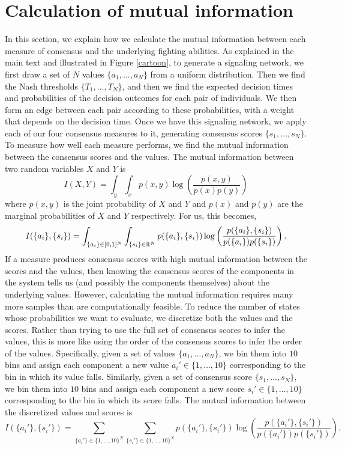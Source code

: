 \documentclass{article}
\begin{document}
\section{Calculation of mutual information \label{mut_info_calc} }
In this section, we explain how we calculate the mutual information between each measure of consensus and the underlying fighting abilities. 
As explained in the main text and illustrated in Figure \ref{cartoon}, to generate a signaling network, we first draw a set of $N$ values $\{a_1,\dots,a_N\}$ from a uniform distribution. Then we find the Nash thresholds $\{T_1,\dots,T_N\}$, and then we find the expected decision times and probabilities of the decision outcomes for each pair of individuals. We then form an edge between each pair according to these probabilities, with a weight that depends on the decision time.  Once we have this signaling network, we apply each of our four consensus measures to it, generating consensus scores $\{s_1,\dots,s_N\}$.  To measure how well each measure performs, we find the mutual information between the consensus scores and the values. The mutual information between two random variables $X$ and $Y$ is 
\begin{equation}
I(X,Y)=\int_{y}\int_{x}p(x,y)\log\left(\frac{p(x,y)}{p(x)p(y)}\right)
\end{equation}
where $p(x,y)$ is the joint probability of $X$ and $Y$ and $p(x)$ and $p(y)$ are the marginal probabilities of $X$ and $Y$ respectively. For us, this becomes,
\begin{equation}
I(\{a_i\},\{s_i\})=\int_{\{a_i\}\in[0,1]^N}\int_{\{s_i\}\in{\mathbb{R}}^N}p(\{a_i\},\{s_i\})\log\left(\frac{p(\{a_i\},\{s_i\})}{p(\{a_i\})p(\{s_i\})}\right).
\end{equation}
If a measure produces consensus scores with high mutual information between the scores and the values, then knowing the consensus scores of the components in the system tells us (and possibly the components themselves) about the underlying values.  However, calculating the mutual information requires many more samples than are computationally feasible.  To reduce the number of states whose probabilities we want to evaluate, we discretize both the values and the scores.  Rather than trying to use the full set of consensus scores to infer the values, this is more like using the order of the consensus scores to infer the order of the values. Specifically, given a set of values $\{a_1,\dots,a_N\}$, we bin them into $10$ bins and assign each component a new value $a_i'\in\{1,\dots,10\}$ corresponding to the bin in which its value falls.  Similarly, given a set of consensus score $\{s_1,\dots,s_N\}$, we bin them into $10$ bins and assign each component a new score $s_i'\in\{1,\dots,10\}$ corresponding to the bin in which its score falls.  The mutual information between the discretized values and scores is
\begin{equation}
I(\{a_i'\},\{s_i'\})=\sum_{\{a_i'\}\in\{1,\dots,10\}^N}\sum_{\{s_i'\}\in\{1,\dots,10\}^N}p(\{a_i'\},\{s_i'\})\log\left(\frac{p(\{a_i'\},\{s_i'\})}{p(\{a_i'\})p(\{s_i'\})}\right).
\end{equation}
\end{document}
